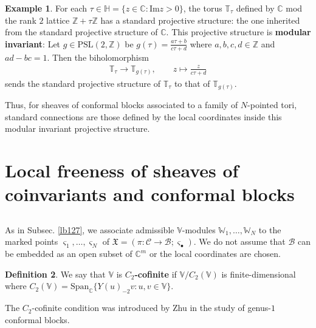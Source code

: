 \documentclass[12pt,a4paper,notitlepage]{article}
\theoremstyle{definition}
\newtheorem{df}{Definition}[section]
\newtheorem{eg}[df]{Example}
\theoremstyle{plain}
\newcommand{\fk}{\mathfrak}
\newcommand{\mc}{\mathcal}
\newcommand{\Span}{\mathrm{Span}}
\newcommand{\sgm}{\varsigma}
\newcommand{\mbb}{\mathbb}
\newcommand{\blt}{\bullet}
\newcommand{\Vbb}{\mathbb V}
\newcommand{\Wbb}{\mathbb W}
\newcommand{\Cbb}{\mathbb C}
\newcommand{\Zbb}{\mathbb Z}
\newcommand{\Hbb}{\mathbb H}
\newcommand{\Imag}{\mathrm{Im}}
\numberwithin{equation}{section}
\begin{document}
\begin{eg}
For each $\tau\in\Hbb=\{z\in\Cbb:\Imag z>0\}$, the torus $\mbb T_\tau$ defined by $\Cbb$ mod the rank $2$ lattice $\Zbb+\tau\Zbb$ has a standard projective structure: the one inherited from the standard projective structure of $\Cbb$. This projective structure is \textbf{modular invariant}: Let $g\in\mathrm{PSL}(2,\Zbb)$ be $g(\tau)=\frac{a\tau+b}{c\tau+d}$ where $a,b,c,d\in\Zbb$ and $ad-bc=1$. Then the biholomorphism
\begin{align*}
\mbb T_\tau\rightarrow\mbb T_{g(\tau)},\qquad z\mapsto\frac{z}{c\tau+d}
\end{align*}
sends the standard projective structure of $\mbb T_\tau$ to that of $\mbb T_{g(\tau)}$.

Thus, for sheaves of conformal blocks associated to a family of $N$-pointed tori, standard connections are those defined by the local coordinates inside this modular invariant projective structure.  \hfill  \qedsymbol
\end{eg}












\section{Local freeness of sheaves of coinvariants and conformal blocks}\label{lb153}



\subsection{}

As in Subsec. \ref{lb127}, we associate admissible $\Vbb$-modules $\Wbb_1,\dots,\Wbb_N$ to the marked points $\sgm_1,\dots,\sgm_N$ of $\fk X=(\pi:\mc C\rightarrow\mc B;\sgm_\blt)$. We do not assume that $\mc B$ can be embedded as an open subset of $\Cbb^m$ or the local coordinates are chosen.
 
\begin{df}
We say that $\Vbb$ is \textbf{$C_2$-cofinite}  if $\Vbb/C_2(\Vbb)$ is finite-dimensional where  $C_2(\Vbb)=\Span_\Cbb\{Y(u)_{-2}v:u,v\in\Vbb\}$.
\end{df}

The $C_2$-cofinite condition was introduced by Zhu \cite{Zhu96} in the study of genus-$1$ conformal blocks.
\end{document}
